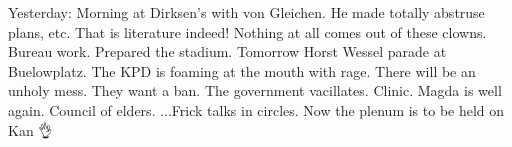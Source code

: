 Yesterday: Morning at Dirksen's with von Gleichen. He made totally abstruse plans,  etc. That is literature indeed! Nothing at all comes out of these clowns. Bureau work. Prepared the stadium. Tomorrow Horst Wessel parade at Buelowplatz. The KPD is foaming at the mouth with rage. There will be an unholy mess. They want a ban. The government vacillates. Clinic. Magda is well again. Council of elders. ...Frick talks in circles. Now the plenum is to be held on Kan 👌